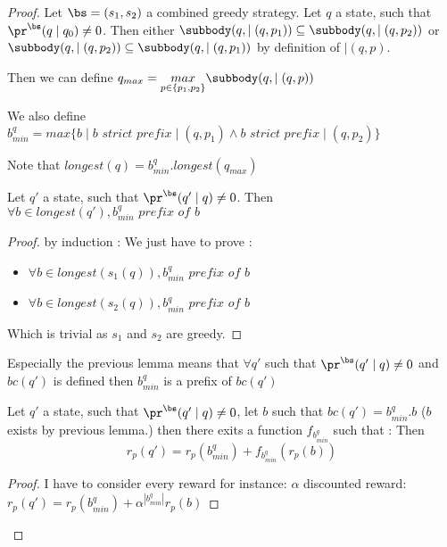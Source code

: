 \begin{proof}
	Let $\bs = (s_1,s_2)$ a combined greedy strategy. 
	Let $q$ a state, such that $\pr^{\bs}(q \mid q_0) \neq 0$. 
	Then either $\subbody(q,\mid(q,p_1)) \subseteq \subbody(q,\mid(q,p_2))$ or $\subbody(q,\mid(q,p_2)) \subseteq \subbody(q,\mid(q,p_1))$ by definition of $\mid(q,p)$.
	
	Then we  can define $q_{max} = \underset{p \in \{p_1,p_2\}}{max}\subbody(q,\mid(q,p))$
	
	We also define $b^q_{min} = max\{b \mid b \textit{ strict prefix} \mid(q,p_1) \land b \textit{ strict prefix} \mid(q,p_2) \}$
	
	Note that $longest(q) = b^q_{min}.longest(q_{max})$
	
	\begin{mylem}
	Let $q'$ a state, such that $\pr^{\bs}(q' \mid q) \neq 0$. 
	Then  $\forall b \in longest(q'), b^q_{min} \textit{ prefix of } b$
	\end{mylem}
	\begin{proof}
		by induction : 
		We just have to prove : 
		\begin{itemize}
		\item $\forall b \in longest(s_1(q)), b^q_{min} \textit{ prefix of } b $
		\item $\forall b \in longest(s_2(q)), b^q_{min} \textit{ prefix of } b $
		\end{itemize}
	Which is trivial as $s_1$ and $s_2$ are greedy.
	\end{proof}

Especially the previous lemma means that $\forall q'$ such that $\pr^{\bs}(q' \mid q) \neq 0$ and $bc(q')$ is defined then $b^q_{min}$ is a prefix of $bc(q')$



\begin{mylem}
	Let $q'$ a state, such that $\pr^{\bs}(q' \mid q) \neq 0$, let $b$ such that $bc(q') = b^q_{min}.b$ ($b$ exists by previous lemma.) then there exits a function $f_{b^q_{min}}$ such that :
	Then  $$r_p(q') = r_p(b^q_{min}) + f_{b^q_{min}}(r_p(b))$$
\end{mylem}
\begin{proof}
	I have to consider every reward for instance:  $\alpha$ discounted reward: 
	$r_p(q') = r_p(b^q_{min}) + \alpha^{|b^q_{min}|}r_p(b)$
\end{proof}


\end{proof}
